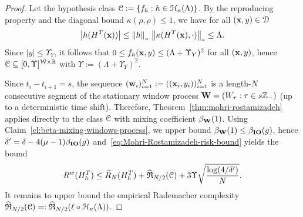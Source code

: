\begin{proof}

Let the hypothesis class ${\mathcal{C}} := \{f_h : h \in {\mathcal{H}}_{\kappa}(\Lambda)\}$. By the reproducing property and the diagonal bound $\kappa(\rho, \rho) \leq 1$, we have for all $({\mathbf{x}},y) \in {\mathcal{D}}$
\begin{equation*}
    \left| h(H^T({\mathbf{x}})) \right| \leq \left\lVert h\right\rVert_{\scriptscriptstyle \kappa}\,\left\lVert\kappa(H^T({\mathbf{x}}), \cdot)\right\rVert_{\scriptscriptstyle \kappa} \leq \Lambda.
\end{equation*}
Since $|y| \leq \Upsilon_Y$, it follows that $0 \leq f_h({\mathbf{x}}, y) \leq (\Lambda + \Upsilon_Y)^2$ for all $({\mathbf{x}}, y)$, hence ${\mathcal{C}} \subseteq [0,\Upsilon]^{{\mathcal{W}} \times {\mathbb{R}}}$ with $\Upsilon := (\Lambda + \Upsilon_Y)^2$.

Since $t_i-t_{i+1}=s$, the sequence $({\mathbf{w}}_i)_{i=1}^N:=(({\mathbf{x}}_i,y_i))_{i=1}^N$ is a length-$N$ consecutive segment of the stationary window process ${\mathbf{W}}=(W_\tau:\tau\in s{\mathbb{Z}}_-)$ (up to a deterministic time shift).
Therefore, Theorem~\ref{thm:mohri-rostamizadeh} applies directly to the class ${\mathcal{C}}$ with mixing coefficient $\beta_{{\mathbf{W}}}(1)$.
Using Claim~\ref{cl:beta-mixing-windows-process}, we upper bound $\beta_{{\mathbf{W}}}(1)\le \beta_{\mathbf{IO}}(g)$,
hence $\delta'=\delta-4(\mu-1)\beta_{\mathbf{IO}}(g)$ and~\cref{eq:Mohri-Rostamizadeh-risk-bound} yields the bound
\begin{equation*}
    R^w(H_h^T) \leq \widehat R_N(H_h^T) + \widehat{\mathfrak{R}}_{N/2}({\mathcal{C}}) + 3 \Upsilon \sqrt{\frac{\log(4/\delta')}{N}}.
\end{equation*}
It remains to upper bound the empirical Rademacher complexity $\widehat{\mathfrak{R}}_{N/2}({\mathcal{C}}) =: \widehat{\mathfrak{R}}_{N/2}(\ell \circ {\mathcal{H}}_{\kappa}(\Lambda))$. 


\end{proof}

